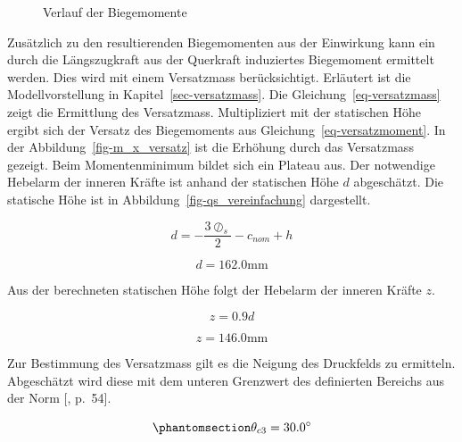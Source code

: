 \documentclass[
  12pt,
  letterpaper,
  egregdoesnotlikesansseriftitles]{scrreprt}
\begin{document}
\begin{figure}[H]


\caption{\label{fig-m_x}Verlauf der Biegemomente}

\end{figure}%

Zusätzlich zu den resultierenden Biegemomenten aus der Einwirkung kann
ein durch die Längszugkraft aus der Querkraft induziertes Biegemoment
ermittelt werden. Dies wird mit einem Versatzmass berücksichtigt.
Erläutert ist die Modellvorstellung in Kapitel~\ref{sec-versatzmass}.
Die Gleichung~\ref{eq-versatzmass} zeigt die Ermittlung des Versatzmass.
Multipliziert mit der statischen Höhe ergibt sich der Versatz des
Biegemoments aus Gleichung~\ref{eq-versatzmoment}. In der
Abbildung~\ref{fig-m_x_versatz} ist die Erhöhung durch das Versatzmass
gezeigt. Beim Momentenminimum bildet sich ein Plateau aus. Der
notwendige Hebelarm der inneren Kräfte ist anhand der statischen Höhe
\(d\) abgeschätzt. Die statische Höhe ist in
Abbildung~\ref{fig-qs_vereinfachung} dargestellt.

\begin{equation}d = - \frac{3 \oslash_{s}}{2} - c_{nom} + h\end{equation}

\begin{equation}d = 162.0 \text{mm}\end{equation}

Aus der berechneten statischen Höhe folgt der Hebelarm der inneren
Kräfte \(z\).

\begin{equation}z = 0.9 d\end{equation}

\begin{equation}z = 146.0 \text{mm}\end{equation}

Zur Bestimmung des Versatzmass gilt es die Neigung des Druckfelds zu
ermitteln. Abgeschätzt wird diese mit dem unteren Grenzwert des
definierten Bereichs aus der Norm {[},
p.~54{]}.

\begin{equation}\phantomsection\label{eq-theta_c3}{
 \theta_{c3} = 30.0^{\circ} 
}\end{equation}
\end{document}
